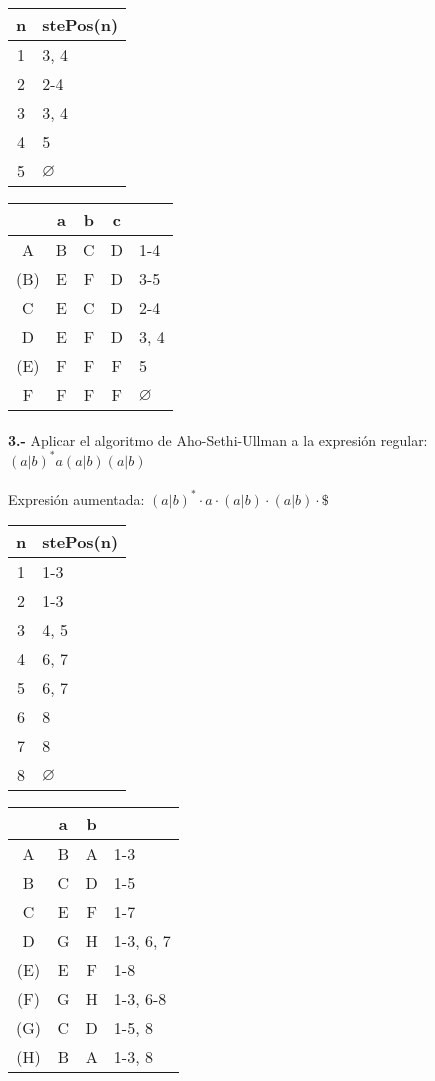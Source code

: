 \documentclass[11pt,a4paper]{report}
\begin{document}
\begin{tabular} {| c | l |}
\hline
n & stePos(n) \\ \hline
1 & 3, 4 \\ \hline
2 & 2-4 \\ \hline
3 & 3, 4 \\ \hline
4 & 5 \\ \hline
5 & $\varnothing$ \\ \hline
\end{tabular}
\quad
\begin{tabular} {| c | c |c |c | l |}
\hline 
& a & b & c & \\ \hline
A & B & C & D & 1-4\\ \hline
(B) & E & F & D & 3-5\\ \hline
C & E & C & D & 2-4\\ \hline
D & E & F & D & 3, 4\\ \hline
(E) & F & F & F & 5\\ \hline
F & F & F & F & $\varnothing$\\ \hline
\end{tabular}\paragraph{}
\textbf{3.-} Aplicar el algoritmo de Aho-Sethi-Ullman a la expresión regular: \textbf{$ (a|b)^*a(a|b)(a|b) $} \\
\\
Expresión aumentada: $ (a|b)^*\cdot a\cdot (a|b)\cdot (a|b)\cdot \$  $ \\

\begin{tabular} {| c | l |}
\hline
n & stePos(n) \\ \hline
1 & 1-3 \\ \hline
2 & 1-3 \\ \hline
3 & 4, 5 \\ \hline
4 & 6, 7 \\ \hline
5 & 6, 7 \\ \hline
6 & 8 \\ \hline
7 & 8 \\ \hline
8 & $\varnothing$ \\ \hline
\end{tabular}
\quad
\begin{tabular} {| c | c |c | l |}
\hline 
& a & b & \\ \hline
A & B & A & 1-3\\ \hline
B & C & D & 1-5\\ \hline
C & E & F & 1-7\\ \hline
D & G & H & 1-3, 6, 7\\ \hline
(E) & E & F & 1-8\\ \hline
(F) & G & H & 1-3, 6-8\\ \hline
(G) & C & D & 1-5, 8\\ \hline
(H) & B & A & 1-3, 8\\ \hline
\end{tabular}
\end{document}

